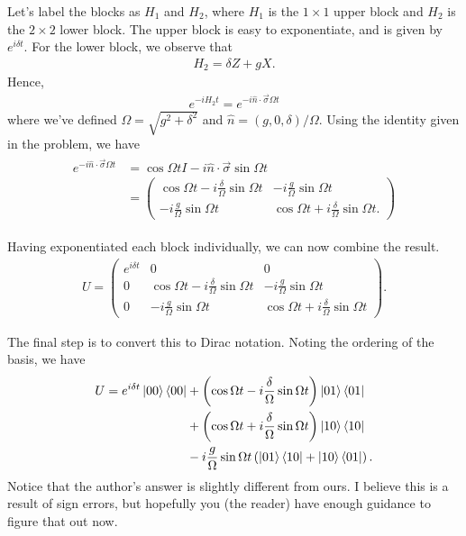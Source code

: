 \documentclass{book}
\begin{document}
    Let's label the blocks as $H_1$ and $H_2$, where $H_1$ is the $1\times 1$ upper block and $H_2$ is the $2 \times 2$ lower block. The upper block is easy to exponentiate, and is given by $e^{i\delta t}$. For the lower block, we observe that
    \begin{align}
        H_2 = \delta Z + g X.
    \end{align}
    Hence,
    \begin{align}
        e^{-i H_2 t} = e^{-i \hat{n}\cdot \vec{\sigma} \Omega t}
    \end{align}
    where we've defined $\Omega = \sqrt{g^2 + \delta^2}$ and $\hat{n} = (g, 0 , \delta)/\Omega$. Using the identity given in the problem, we have
    \begin{align}
    \begin{aligned}
        e^{-i \hat{n}\cdot \vec{\sigma}\Omega t} &= \cos{\Omega t} I - i \hat{n}\cdot\vec{\sigma} \sin{\Omega t} \\
        &= \begin{pmatrix}
            \cos\Omega t - i \frac{\delta}{\Omega} \sin\Omega t & -i \frac{g}{\Omega}\sin\Omega t \\
            -i \frac{g}{\Omega}\sin\Omega t & \cos\Omega t + i \frac{\delta}{\Omega}\sin\Omega t.
        \end{pmatrix}
    \end{aligned}
    \end{align}
    
    Having exponentiated each block individually, we can now combine the result.
    \begin{align}
        U = \begin{pmatrix}
            e^{i\delta t} & 0 & 0 \\
            0 & \cos\Omega t - i \frac{\delta}{\Omega} \sin\Omega t & -i \frac{g}{\Omega}\sin\Omega t \\
            0 & -i \frac{g}{\Omega}\sin\Omega t & \cos\Omega t + i \frac{\delta}{\Omega}\sin\Omega t
        \end{pmatrix}.
    \end{align}

    The final step is to convert this to Dirac notation. Noting the ordering of the basis, we have
    \begin{align}
    \begin{aligned}
        U = e^{i\delta t} \ket{00}\bra{00} &+ \left(\cos \Omega t - i \frac{\delta}{\Omega} \sin \Omega t\right) \ket{01}\bra{01} \\
        &+ \left(\cos \Omega t 
        + i \frac{\delta}{\Omega} \sin \Omega t\right) \ket{10}\bra{10} \\
        &-i \frac{g}{\Omega}\sin\Omega t \left(\ket{01}\bra{10} + \ket{10}\bra{01}\right).
    \end{aligned}
    \end{align}
    Notice that the author's answer is slightly different from ours. I believe this is a result of sign errors, but hopefully you (the reader) have enough guidance to figure that out now.
    
\end{document}
